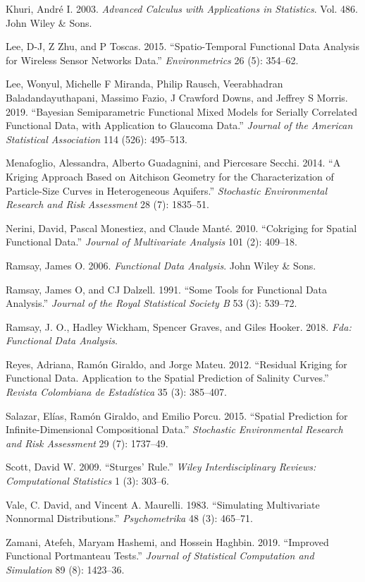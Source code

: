 \documentclass[12pt,]{article}
\theoremstyle{definition}
\theoremstyle{definition}
\theoremstyle{definition}
\theoremstyle{remark}
\begin{document}
\leavevmode\hypertarget{ref-khuri2003advanced}{}%
Khuri, André I. 2003. \emph{Advanced Calculus with Applications in Statistics}. Vol. 486. John Wiley \& Sons.

\leavevmode\hypertarget{ref-lee2015spatio}{}%
Lee, D-J, Z Zhu, and P Toscas. 2015. ``Spatio-Temporal Functional Data Analysis for Wireless Sensor Networks Data.'' \emph{Environmetrics} 26 (5): 354--62.

\leavevmode\hypertarget{ref-lee2019bayesian}{}%
Lee, Wonyul, Michelle F Miranda, Philip Rausch, Veerabhadran Baladandayuthapani, Massimo Fazio, J Crawford Downs, and Jeffrey S Morris. 2019. ``Bayesian Semiparametric Functional Mixed Models for Serially Correlated Functional Data, with Application to Glaucoma Data.'' \emph{Journal of the American Statistical Association} 114 (526): 495--513.

\leavevmode\hypertarget{ref-menafoglio2014kriging}{}%
Menafoglio, Alessandra, Alberto Guadagnini, and Piercesare Secchi. 2014. ``A Kriging Approach Based on Aitchison Geometry for the Characterization of Particle-Size Curves in Heterogeneous Aquifers.'' \emph{Stochastic Environmental Research and Risk Assessment} 28 (7): 1835--51.

\leavevmode\hypertarget{ref-nerini2010cokriging}{}%
Nerini, David, Pascal Monestiez, and Claude Manté. 2010. ``Cokriging for Spatial Functional Data.'' \emph{Journal of Multivariate Analysis} 101 (2): 409--18.

\leavevmode\hypertarget{ref-ramsay2006functional}{}%
Ramsay, James O. 2006. \emph{Functional Data Analysis}. John Wiley \& Sons.

\leavevmode\hypertarget{ref-ramsay1991some}{}%
Ramsay, James O, and CJ Dalzell. 1991. ``Some Tools for Functional Data Analysis.'' \emph{Journal of the Royal Statistical Society B} 53 (3): 539--72.

\leavevmode\hypertarget{ref-ramsay2018}{}%
Ramsay, J. O., Hadley Wickham, Spencer Graves, and Giles Hooker. 2018. \emph{Fda: Functional Data Analysis}.

\leavevmode\hypertarget{ref-reyesresidual}{}%
Reyes, Adriana, Ramón Giraldo, and Jorge Mateu. 2012. ``Residual Kriging for Functional Data. Application to the Spatial Prediction of Salinity Curves.'' \emph{Revista Colombiana de Estadística} 35 (3): 385--407.

\leavevmode\hypertarget{ref-salazar2015spatial}{}%
Salazar, Elías, Ramón Giraldo, and Emilio Porcu. 2015. ``Spatial Prediction for Infinite-Dimensional Compositional Data.'' \emph{Stochastic Environmental Research and Risk Assessment} 29 (7): 1737--49.

\leavevmode\hypertarget{ref-scott2009sturges}{}%
Scott, David W. 2009. ``Sturges' Rule.'' \emph{Wiley Interdisciplinary Reviews: Computational Statistics} 1 (3): 303--6.

\leavevmode\hypertarget{ref-Vale1983}{}%
Vale, C. David, and Vincent A. Maurelli. 1983. ``Simulating Multivariate Nonnormal Distributions.'' \emph{Psychometrika} 48 (3): 465--71.

\leavevmode\hypertarget{ref-zamani2019improved}{}%
Zamani, Atefeh, Maryam Hashemi, and Hossein Haghbin. 2019. ``Improved Functional Portmanteau Tests.'' \emph{Journal of Statistical Computation and Simulation} 89 (8): 1423--36.
\end{document}
